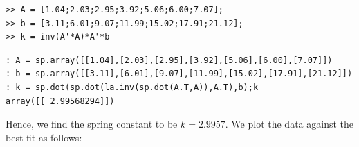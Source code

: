\begin{matlab}
\begin{lstlisting}[style=matlab]
>> A = [1.04;2.03;2.95;3.92;5.06;6.00;7.07];
>> b = [3.11;6.01;9.07;11.99;15.02;17.91;21.12];
>> k = inv(A'*A)*A'*b
\end{lstlisting}
\end{matlab}
\begin{python}
\begin{lstlisting}[style=python]
: A = sp.array([[1.04],[2.03],[2.95],[3.92],[5.06],[6.00],[7.07]])
: b = sp.array([[3.11],[6.01],[9.07],[11.99],[15.02],[17.91],[21.12]])
: k = sp.dot(sp.dot(la.inv(sp.dot(A.T,A)),A.T),b);k
array([[ 2.99568294]])
\end{lstlisting}
\end{python}
Hence, we find the spring constant to be $k = 2.9957$.  We plot the data against the best fit as follows:
